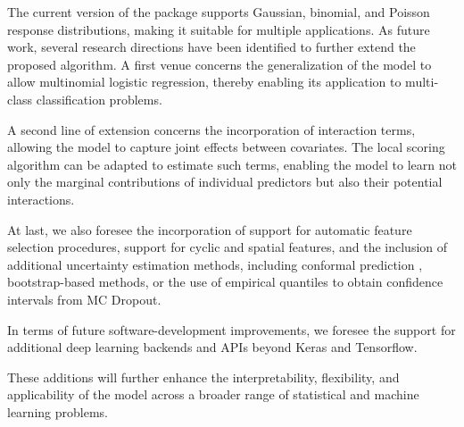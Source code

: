 The current version of the package supports Gaussian, binomial, and Poisson response distributions, making it suitable for multiple applications. As future work, several research directions have been identified to further extend the proposed algorithm. A first venue concerns the generalization of the model to allow multinomial logistic regression, thereby enabling its application to multi-class classification problems. %

A second line of extension concerns the incorporation of interaction terms, allowing the model to capture joint effects between covariates. %
The local scoring algorithm can be adapted to estimate such terms, enabling the model to learn not only the marginal contributions of individual predictors but also their potential interactions.

At last, we also foresee the incorporation of support for automatic feature selection procedures, support for cyclic and spatial features, and the inclusion of additional uncertainty estimation methods, including conformal prediction \citep{karimi2023quantifying}, bootstrap-based methods, or the use of empirical quantiles to obtain confidence intervals from MC Dropout.

In terms of future software-development improvements, we foresee the support for additional deep learning backends and APIs beyond Keras and Tensorflow. 

These additions will further enhance the interpretability, flexibility, and applicability of the model across a broader range of statistical and machine learning problems.

